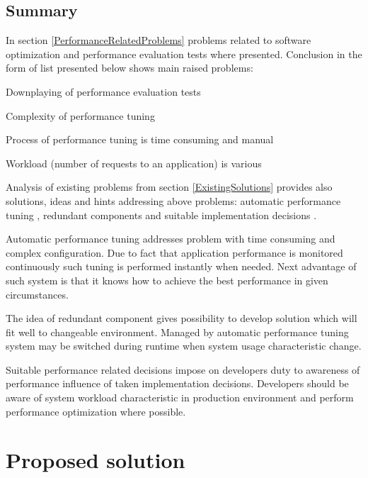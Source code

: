 \documentclass[12pt,a4paper]{article}
\let\tempone\itemize
\let\temptwo\enditemize
\renewenvironment{itemize}{\tempone\addtolength{\itemsep}{-0.4\baselineskip}}{\temptwo}
\begin{document}
\subsection{Summary}

In section \ref{PerformanceRelatedProblems} problems related to software optimization and performance evaluation tests where presented. Conclusion in the form of list presented below shows main raised problems:
\begin{itemize} 
\item Downplaying of performance evaluation tests \cite{artperformance}\cite{lssrarticle}
\item Complexity of performance tuning \cite{glassfishdoc}\cite{deployerproblem}
\item Process of performance tuning is time consuming and manual \cite{deployerproblem}
\item Workload (number of requests to an application) is various \cite{invariantsworkloads}
\end{itemize}

Analysis of existing problems from section \ref{ExistingSolutions} provides also solutions, ideas and hints addressing above problems:
automatic performance tuning \cite{autotuning}\cite{autoarch}\cite{autoframework}, redundant components \cite{redundancycomponent} and suitable implementation decisions \cite{springperformance}. 

Automatic performance tuning addresses problem with time consuming and complex configuration. Due to fact that application performance is monitored continuously such tuning is performed instantly when needed. Next advantage of such system is that it knows how to achieve the best performance in given circumstances. 

The idea of redundant component gives possibility to develop solution which will fit well to changeable environment. Managed by automatic performance tuning system may be switched during runtime when system usage characteristic change. 

Suitable performance related decisions impose on developers duty to awareness of performance influence of taken implementation decisions. Developers should be aware of system workload characteristic in production environment and perform performance optimization where possible. 
 
\section{Proposed solution} \label{section:proposedsolution}
\end{document}
